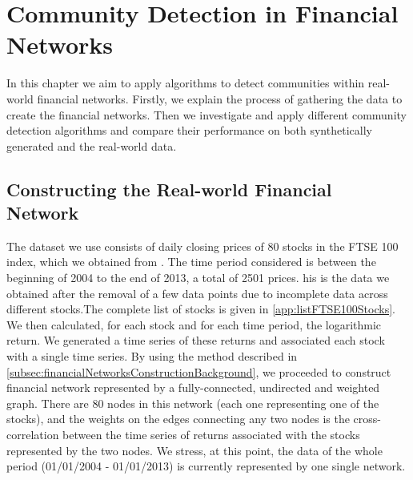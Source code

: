 
\chapter{Community Detection in Financial Networks}

\label{cha:communityDetectionFinancialNetworks}


In this chapter we aim to apply algorithms to detect communities within real-world financial networks.
Firstly, we explain the process of gathering the data to create the financial networks.
Then we investigate and apply different community detection algorithms and compare their performance on both synthetically generated and the real-world data.


\section{Constructing the Real-world Financial Network}
\label{sec:realWorldFinancialNetwork}

The dataset we use consists of daily closing prices of 80 stocks in the FTSE 100 index, which we obtained from \cite{YahFi}.
The time period considered is between the beginning of 2004 to the end of 2013, a total of 2501 prices. 
his is the data we obtained after the removal of a few data points due to incomplete data across different stocks.The complete list of stocks is given in \cref{app:listFTSE100Stocks}.
We then calculated, for each stock and for each time period, the logarithmic return. We generated a time series of these returns and associated each stock with a single time series.
By using the method described in \cref{subsec:financialNetworksConstructionBackground}, we proceeded to construct financial network represented by a fully-connected, undirected and weighted graph. There are 80 nodes in this network (each one representing one of the stocks), and the weights on the edges connecting any two nodes is the cross-correlation between the time series of returns associated with the stocks represented by the two nodes.
We stress, at this point, the data of the whole period (01/01/2004 - 01/01/2013) is currently represented by one single network.

